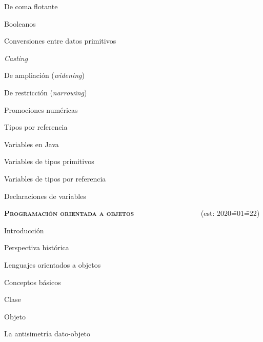 \begin{longenum}
\begin{longenum}
\begin{longenum}
\begin{longenum}
                \item De coma flotante
                \item Booleanos
                \item Conversiones entre datos primitivos
                \begin{longenum}
                    \item \textit{Casting}
                    \item De ampliación (\textit{widening})
                    \item De restricción (\textit{narrowing})
                \end{longenum}
                \item Promociones numéricas
            \end{longenum}
            \item Tipos por referencia
        \end{longenum}
        \item Variables en Java
        \begin{longenum}
            \item Variables de tipos primitivos
            \item Variables de tipos por referencia
            \item Declaraciones de variables
        \end{longenum}
    \end{longenum}
    \item \textbf{\textsc{Programación orientada a objetos}} \ \ \ \ \ \ \ \ \ \ \ \ \ \ \ \ \ \ (est: 2020\==01\==22)
    \begin{longenum}
        \item Introducción
        \begin{longenum}
            \item Perspectiva histórica
            \item Lenguajes orientados a objetos
        \end{longenum}
        \item Conceptos básicos
        \begin{longenum}
            \item Clase
            \item Objeto
            \begin{longenum}
                \item La antisimetría dato-objeto

\end{longenum}
\end{longenum}
\end{longenum}
\end{longenum}
